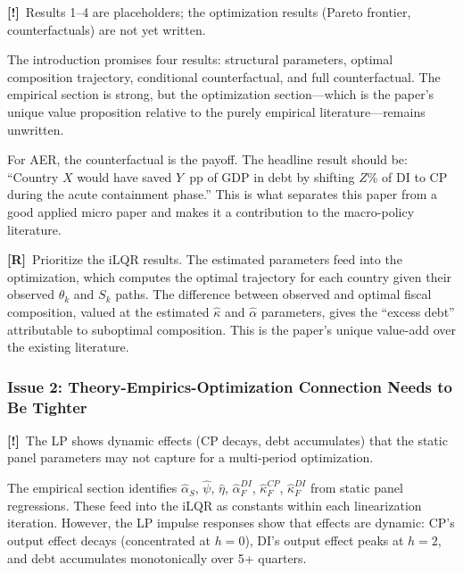 \documentclass[12pt, a4paper]{article}
\newcommand{\concern}[1]{\textcolor{concern}{\textbf{[!]}~#1}}
\newcommand{\recommend}[1]{\textcolor{recommend}{\textbf{[R]}~#1}}
\begin{document}
\concern{Results 1--4 are placeholders; the optimization results (Pareto frontier, counterfactuals) are not yet written.}

The introduction promises four results: structural parameters, optimal composition trajectory, conditional counterfactual, and full counterfactual. The empirical section is strong, but the optimization section---which is the paper's unique value proposition relative to the purely empirical literature---remains unwritten.

For AER, the counterfactual is the payoff. The headline result should be: ``Country $X$ would have saved $Y$~pp of GDP in debt by shifting $Z$\% of DI to CP during the acute containment phase.'' This is what separates this paper from a good applied micro paper and makes it a contribution to the macro-policy literature.

\recommend{Prioritize the iLQR results.} The estimated parameters feed into the optimization, which computes the optimal trajectory for each country given their observed $\theta_k$ and $S_k$ paths. The difference between observed and optimal fiscal composition, valued at the estimated $\hat{\kappa}$ and $\hat{\alpha}$ parameters, gives the ``excess debt'' attributable to suboptimal composition. This is the paper's unique value-add over the existing literature.


\subsubsection*{Issue 2: Theory-Empirics-Optimization Connection Needs to Be Tighter}

\concern{The LP shows dynamic effects (CP decays, debt accumulates) that the static panel parameters may not capture for a multi-period optimization.}

The empirical section identifies $\hat{\alpha}_S$, $\hat{\psi}$, $\hat{\eta}$, $\hat{\alpha}_F^{DI}$, $\hat{\kappa}_F^{CP}$, $\hat{\kappa}_F^{DI}$ from static panel regressions. These feed into the iLQR as constants within each linearization iteration. However, the LP impulse responses show that effects are dynamic: CP's output effect decays (concentrated at $h = 0$), DI's output effect peaks at $h = 2$, and debt accumulates monotonically over 5+ quarters.
\end{document}
